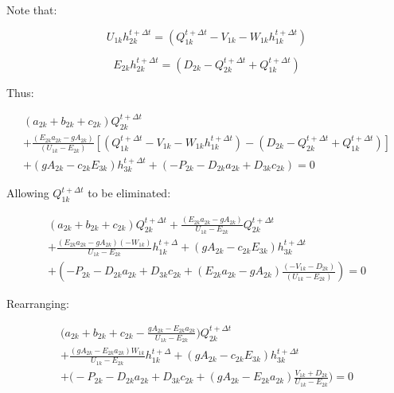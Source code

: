 \documentclass[11pt]{article}
\begin{document}
Note that:

\begin{equation}
U_{1k} h_{2k}^{t + \Delta t} = (Q_{1k}^{t + \Delta t} - V_{1k} - W_{1k}
h_{1k}^{t + \Delta t})
\end{equation}

\begin{equation}
E_{2k} h_{2k}^{t + \Delta t} = (D_{2k} -
Q_{2k}^{t + \Delta t} + Q_{1k}^{t + \Delta t})
\end{equation}

Thus:

\begin{equation}
  \begin{split}
    (a_{2k} + b_{2k} + c_{2k})  Q_{2k}^{t + \Delta t} \\ + \frac{(E_{2k} a_{2k} - g A_{2k})}{(U_{1k} - E_{2k})} [(Q_{1k}^{t + \Delta t} - V_{1k} - W_{1k} h_{1k}^{t + \Delta t}) - (D_{2k} - Q_{2k}^{t + \Delta t} + Q_{1k}^{t + \Delta t})] \\ + (g A_{2k} - c_{2k} E_{3k}) h_{3k}^{t + \Delta t}   
    + (- P_{2k} - D_{2k} a_{2k}   + D_{3k} c_{2k} ) = 0 
  \end{split}
\end{equation}

Allowing $Q_{1k}^{t + \Delta t}$ to be eliminated:

\begin{equation}
  \begin{split}
    (a_{2k} + b_{2k} + c_{2k})  Q_{2k}^{t + \Delta t} + \frac{(E_{2k} a_{2k} - g A_{2k})}{U_{1k} - E_{2k}} Q_{2k}^{t + \Delta t} \\ + \frac{(E_{2k} a_{2k} - g A_{2k}) ( - W_{1k} )}{U_{1k} - E_{2k}} h_{1k}^{t + \Delta} + (g A_{2k} - c_{2k} E_{3k}) h_{3k}^{t + \Delta t}   
   \\ + (- P_{2k} - D_{2k} a_{2k}   + D_{3k} c_{2k} + (E_{2k} a_{2k} - g A_{2k}) \frac{ ( - V_{1k} - D_{2k} )}{( U_{1k} - E_{2k} )} ) = 0 
  \end{split}
\end{equation}

Rearranging:

\begin{equation}
  \begin{split}
    \biggl( a_{2k} + b_{2k} + c_{2k} - \frac{g A_{2k} - E_{2k} a_{2k}}{U_{1k} - E_{2k}} \biggr)  Q_{2k}^{t + \Delta t} \\ + \frac{(g A_{2k} - E_{2k} a_{2k}) W_{1k} }{U_{1k} - E_{2k}} h_{1k}^{t + \Delta} + (g A_{2k} - c_{2k} E_{3k}) h_{3k}^{t + \Delta t}   
   \\ + \biggl(- P_{2k} - D_{2k} a_{2k}   + D_{3k} c_{2k} + (g A_{2k} - E_{2k} a_{2k}) \frac{ V_{1k} + D_{2k} }{ U_{1k} - E_{2k} } \biggr) = 0 
  \end{split}
\end{equation}
\end{document}
